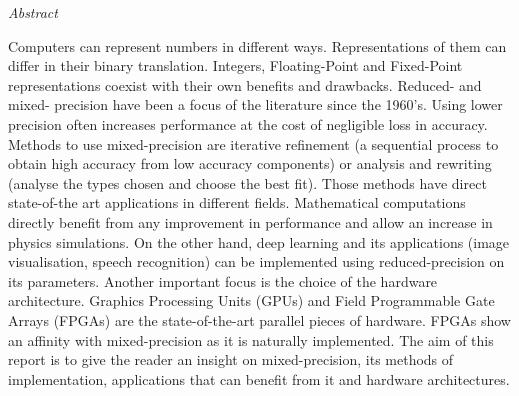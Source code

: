 \documentclass[11pt, oneside]{Thesis} %
\begin{document}
\clearpage %




 {\huge{\textit{Abstract}} \par}{

Computers can represent numbers in different ways. Representations of them can differ in their binary translation. Integers, Floating-Point and Fixed-Point representations coexist with their own benefits and drawbacks. Reduced- and mixed- precision have been a focus of the literature since the 1960's. Using lower precision often increases performance at the cost of negligible loss in accuracy. Methods to use mixed-precision are iterative refinement (a sequential process to obtain high accuracy from low accuracy components) or analysis and rewriting (analyse the types chosen and choose the best fit). Those methods have direct state-of-the art applications in different fields. Mathematical computations directly benefit from any improvement in performance and allow an increase in physics simulations. On the other hand, deep learning and its applications (image visualisation, speech recognition) can be implemented using reduced-precision on its parameters. Another important focus is the choice of the hardware architecture. Graphics Processing Units (GPUs) and Field Programmable Gate Arrays (FPGAs) are the state-of-the-art parallel pieces of hardware. FPGAs show an affinity with mixed-precision as it is naturally implemented. The aim of this report is to give the reader an insight on mixed-precision, its methods of implementation, applications that can benefit from it and hardware architectures.
%


\clearpage %


}
\end{document}
